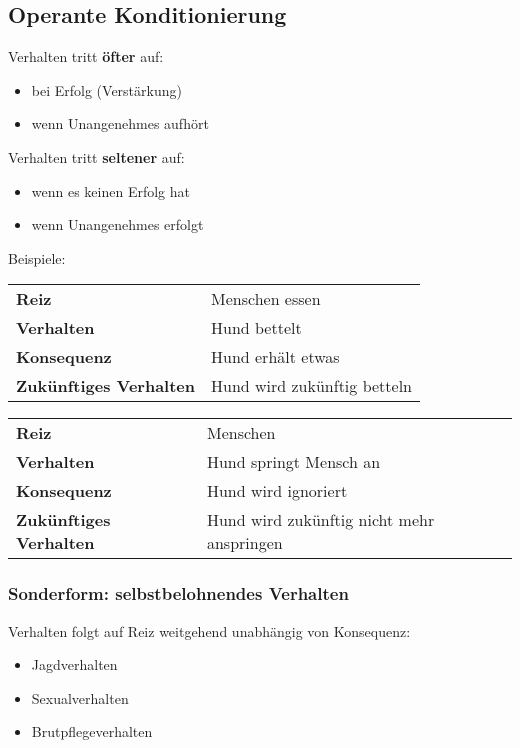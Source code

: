     \subsection{Operante Konditionierung}
        Verhalten tritt \textbf{öfter} auf:
        \begin{itemize}
            \item bei Erfolg (Verstärkung)
            \item wenn Unangenehmes aufhört
        \end{itemize}

        Verhalten tritt \textbf{seltener} auf:
        \begin{itemize}
            \item wenn es keinen Erfolg hat
            \item wenn Unangenehmes erfolgt
        \end{itemize}

        Beispiele: \\
        \begin{tabular}{l|l}
            \textbf{Reiz} & Menschen essen \\
            \textbf{Verhalten} & Hund bettelt \\
            \textbf{Konsequenz} & Hund erhält etwas \\
            \textbf{Zukünftiges Verhalten} & Hund wird zukünftig betteln \\
        \end{tabular}

        \begin{tabular}{l|l}
            \textbf{Reiz} & Menschen \\
            \textbf{Verhalten} & Hund springt Mensch an \\
            \textbf{Konsequenz} & Hund wird ignoriert \\
            \textbf{Zukünftiges Verhalten} & Hund wird zukünftig nicht mehr anspringen \\
        \end{tabular}

        \subsubsection{Sonderform: selbstbelohnendes Verhalten}
            Verhalten folgt auf Reiz weitgehend unabhängig von Konsequenz:
            \begin{itemize}
                \item Jagdverhalten
                \item Sexualverhalten
                \item Brutpflegeverhalten
            \end{itemize}


